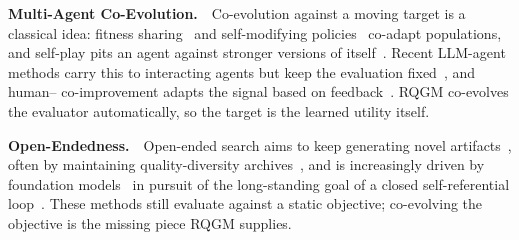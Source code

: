 \noindent\textbf{Multi-Agent Co-Evolution.}~~Co-evolution against a moving target is a classical idea: fitness sharing~\citep{rosin1997new} and self-modifying policies~\citep{schmidhuber1996multi} co-adapt populations, and self-play pits an agent against stronger versions of itself~\citep{silver2016mastering,silver2018general}. Recent LLM-agent methods carry this to interacting agents but keep the evaluation fixed~\citep{chen2025multi,weng2026group}, and human--\AI{} co-improvement adapts the signal based on feedback~\citep{weston2025ai}. RQGM co-evolves the evaluator automatically, so the target is the learned utility itself.

\noindent\textbf{Open-Endedness.}~~Open-ended search aims to keep generating novel artifacts~\citep{stanley2017open,hughes2024open}, often by maintaining quality-diversity archives~\citep{mouret2015illuminating,ecoffet2019go}, and is increasingly driven by foundation models~\citep{huautomated,lu2024ai,novikov2025alphaevolve} in pursuit of the long-standing goal of a closed self-referential loop~\citep{clune2019ai}. These methods still evaluate against a static objective; co-evolving the objective is the missing piece RQGM supplies.